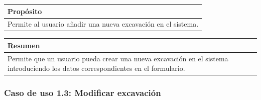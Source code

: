     \begin{table}[H]
        \centering
        \begin{tabularx}{\textwidth}{@{} |L |@{}} \hline
            \textbf{Propósito} \\
            \hline
            Permite al usuario añadir una nueva excavación en el sistema. \\
            \hline
        \end{tabularx}
    \end{table}

    \begin{table}[H]
        \centering
        \begin{tabularx}{\textwidth}{@{} |L |@{}} \hline
            \textbf{Resumen} \\
            \hline
            Permite que un usuario pueda crear una nueva excavación en el sistema
            introduciendo los datos correspondientes en el formulario.\\
            \hline
        \end{tabularx}
    \end{table}

\subsubsection{Caso de uso 1.3: Modificar excavación}

